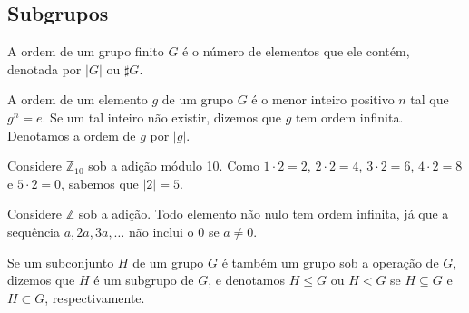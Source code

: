 \subsection*{Subgrupos}
%
\begin{definition}
\label{def-ordem-grupo}
    A ordem de um grupo finito $G$ é o número de elementos que ele contém, denotada por
    $|G|$ ou $\sharp G$.
\end{definition}
%
\begin{definition}
\label{def-ordem-elemento}
    A ordem de um elemento $g$ de um grupo $G$ é o menor inteiro positivo $n$ tal que
    $g^n = e$. Se um tal inteiro não existir, dizemos que $g$ tem ordem infinita. Denotamos
    a ordem de $g$ por $|g|$.
\end{definition}
%
\begin{example}
    Considere $\mathbb{Z}_{10}$ sob a adição módulo 10. Como $1\cdot 2 = 2$, $2\cdot 2 = 4$,
    $3\cdot 2 = 6$, $4\cdot 2 = 8$ e $5\cdot 2 = 0$, sabemos que $|2| = 5$.
\end{example}
%
\begin{example}
    Considere $\mathbb{Z}$ sob a adição. Todo elemento não nulo tem ordem infinita, já que a
    sequência $a, 2a, 3a, \dots$ não inclui o 0 se $a\neq 0$.
\end{example}
%
\begin{definition}
\label{def-subgrupo}
    Se um subconjunto $H$ de um grupo $G$ é também um grupo sob a operação de $G$,
    dizemos que $H$ é um subgrupo de $G$, e denotamos $H \leq G$ ou $H < G$ se $H\subseteq G$
    e $H \subset G$, respectivamente.
\end{definition}
%
